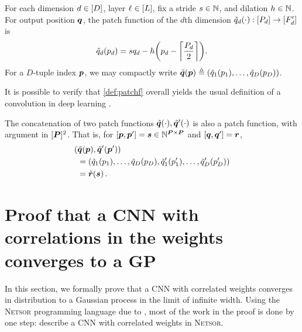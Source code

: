 \documentclass[accepted]{uai2021} %
\newcommand{\Netsor}{\textsc{Netsor}\xspace}
\newcommand{\patchsizebase}{\vP}
\newcommand{\patchsizebases}{P}
\newcommand{\patchf}[2]{{\tilde#1\bra{#2}}}
\newcommand{\patch}{\vp}               %
\newcommand{\patchs}{p}               %
\newcommand{\nextpatch}{\vq}
\newcommand{\nextpatchs}{q}
\newcommand{\0}{\boldsymbol{0}}
\newcommand{\1}{\boldsymbol{1}}
\begin{document}
  \begin{definition}
    \label{def:patchf}
    For each dimension $d \in [D]$, layer $\ell\in[L]$, fix a
    stride $s\in{\mathbb{N}}$,
    and dilation $h \in {\mathbb{N}}$.
   For output position $\nextpatch$, the patch function of the $d$th dimension $\patchf{\nextpatchs_{d}}{\cdot} : \countto{P_{d}} \to \countto{F'_{d}}$ is
\begin{equation}
  \patchf{\nextpatchs_{d}}{\patchs_{d}} = s\nextpatchs_{d} -  h\bra{\patchs_{d} - \ceil{\frac{\patchsizebases_{d}}{2}}} .
  \label{eq:def-patchf}
\end{equation}
For a $D$-tuple index $\patch$, we may compactly write $\patchf{\nextpatch}{\patch} \eqdef \bra{\patchf{\nextpatchs_{1}}{\patchs_{1}}, \dots, \patchf{\nextpatchs_{D}}{\patchs_{D}}}$.
\end{definition}
It is possible to verify that \cref{def:patchf} overall yields the usual definition of a convolution in deep learning \citep[Section~9.1]{deeplearningbook}.

\begin{remark}
  The concatenation of two patch functions $\patchf{\nextpatch}{\cdot},\patchf{\nextpatch'}{\cdot}$ is also a patch function, with argument in $\countto{\patchsizebase}^{2}$. That is, for $[\patch,\patch'] = \vs \in \sN^{\patchsizebase \times \patchsizebase}$ and $[\nextpatch,\nextpatch'] = \vr$,
  \begin{align}
    (&\patchf{\nextpatch}{\patch},\patchf{\nextpatch'}{\patch'}) \nonumber\\&=
    \bra{\patchf{\nextpatchs_{1}}{\patchs_{1}}, \dots, \patchf{\nextpatchs_{D}}{\patchs_{D}},
    \patchf{\nextpatchs'_{1}}{\patchs'_{1}}, \dots, \patchf{\nextpatchs'_{D}}{\patchs'_{D}}
    }\nonumber\\&= \patchf{\vr}{\vs}\,.
  \end{align}
  \label{rem:concat-patchf}
  \end{remark}

\section{Proof that a CNN with correlations in the weights converges to a GP}\label{app:netsor}

In this section, we formally prove that a CNN with correlated weights converges in distribution
to a Gaussian process in the limit of infinite width. Using the \Netsor
programming language due to \citet{yang2019wide}, most of the work in the proof
is done by
one step: describe a CNN with correlated weights in \Netsor.
\end{document}
